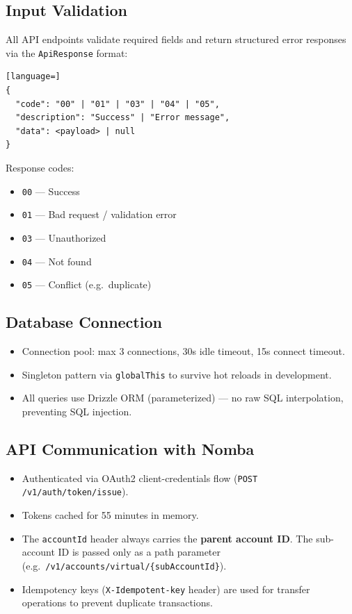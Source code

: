 \documentclass[11pt,a4paper]{article}
\begin{document}
\subsection{Input Validation}

All API endpoints validate required fields and return structured error
responses via the \texttt{ApiResponse} format:

\begin{lstlisting}[language=]
{
  "code": "00" | "01" | "03" | "04" | "05",
  "description": "Success" | "Error message",
  "data": <payload> | null
}
\end{lstlisting}

Response codes:
\begin{itemize}[nosep]
  \item \texttt{00} --- Success
  \item \texttt{01} --- Bad request / validation error
  \item \texttt{03} --- Unauthorized
  \item \texttt{04} --- Not found
  \item \texttt{05} --- Conflict (e.g.\ duplicate)
\end{itemize}

\subsection{Database Connection}

\begin{itemize}[nosep]
  \item Connection pool: max 3 connections, 30s idle timeout, 15s connect
        timeout.
  \item Singleton pattern via \texttt{globalThis} to survive hot reloads
        in development.
  \item All queries use Drizzle ORM (parameterized) --- no raw SQL
        interpolation, preventing SQL injection.
\end{itemize}

\subsection{API Communication with Nomba}

\begin{itemize}[nosep]
  \item Authenticated via OAuth2 client-credentials flow
        (\texttt{POST /v1/auth/token/issue}).
  \item Tokens cached for 55 minutes in memory.
  \item The \texttt{accountId} header always carries the \textbf{parent
        account ID}. The sub-account ID is passed only as a path parameter
        (e.g.\ \texttt{/v1/accounts/virtual/\{subAccountId\}}).
  \item Idempotency keys (\texttt{X-Idempotent-key} header) are used for
        transfer operations to prevent duplicate transactions.
\end{itemize}
\end{document}
